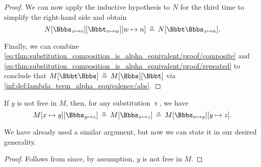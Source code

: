 \begin{proof}
  We can now apply the inductive hypothesis to \( N \) for the third time to simplify the right-hand side and obtain
  \begin{equation}\label{eq:thm:substitution_composition_is_alpha_equivalent/proof/repeated}
    N[\Bbbs_{x \mapsto v}][\Bbbt_{v \mapsto w}][w \mapsto n] \aequiv N[\Bbbt\Bbbs_{x \mapsto n}].
  \end{equation}

  Finally, we can combine \eqref{eq:thm:substitution_composition_is_alpha_equivalent/proof/composite} and \eqref{eq:thm:substitution_composition_is_alpha_equivalent/proof/repeated} to conclude that \( M[\Bbbt\Bbbs] \aequiv M[\Bbbs][\Bbbt] \) via \ref{inf:def:lambda_term_alpha_equivalence/abs}.
\end{proof}

\begin{corollary}\label{thm:substitution_chain_contraction}
  If \( y \) is not free in \( M \), then, for any substitution \( \Bbbs \), we have
  \begin{equation}\label{eq:thm:substitution_chain_contraction/contraction}
    M[x \mapsto y][\Bbbs_{y \mapsto z}]
    \aequiv
    M[\Bbbs_{x \mapsto z}]
    \aequiv
    M[\Bbbs_{x \mapsto y}][y \mapsto z].
  \end{equation}
\end{corollary}
\begin{comments}
  \item We have already used a similar argument, but now we can state it in our desired generality.
\end{comments}
\begin{proof}
  Follows from  since, by assumption, \( y \) is not free in \( M \).
\end{proof}

